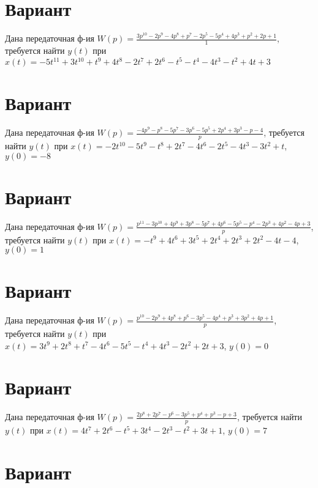 \documentclass{article}
\begin{document}
\section{Вариант}

Дана передаточная ф-ия $W(p)=\frac{3p^{10}-2p^{9}-4p^{8}+p^{7}-2p^{5}-5p^{4}+4p^{3}+p^{2}+2p+1}{1}$, требуется найти $y(t)$ при $x(t)=-5t^{11}+3t^{10}+t^{9}+4t^{8}-2t^{7}+2t^{6}-t^{5}-t^{4}-4t^{3}-t^{2}+4t+3$



\section{Вариант}

Дана передаточная ф-ия $W(p)=\frac{-4p^{9}-p^{8}-5p^{7}-3p^{6}-5p^{5}+2p^{4}+3p^{3}-p-4}{p}$, требуется найти $y(t)$ при $x(t)=-2t^{10}-5t^{9}-t^{8}+2t^{7}-4t^{6}-2t^{5}-4t^{3}-3t^{2}+t$, $y(0)=-8$



\section{Вариант}

Дана передаточная ф-ия $W(p)=\frac{p^{11}-3p^{10}+4p^{9}+3p^{8}-5p^{7}+4p^{6}-5p^{5}-p^{4}-2p^{3}+4p^{2}-4p+3}{p}$, требуется найти $y(t)$ при $x(t)=-t^{9}+4t^{6}+3t^{5}+2t^{4}+2t^{3}+2t^{2}-4t-4$, $y(0)=1$



\section{Вариант}

Дана передаточная ф-ия $W(p)=\frac{p^{10}-2p^{9}+4p^{8}+p^{6}-3p^{5}-4p^{4}+p^{3}+3p^{2}+4p+1}{p}$, требуется найти $y(t)$ при $x(t)=3t^{9}+2t^{8}+t^{7}-4t^{6}-5t^{5}-t^{4}+4t^{3}-2t^{2}+2t+3$, $y(0)=0$



\section{Вариант}

Дана передаточная ф-ия $W(p)=\frac{2p^{8}+2p^{7}-p^{6}-3p^{5}+p^{4}+p^{3}-p+3}{p}$, требуется найти $y(t)$ при $x(t)=4t^{7}+2t^{6}-t^{5}+3t^{4}-2t^{3}-t^{2}+3t+1$, $y(0)=7$



\section{Вариант}
\end{document}
